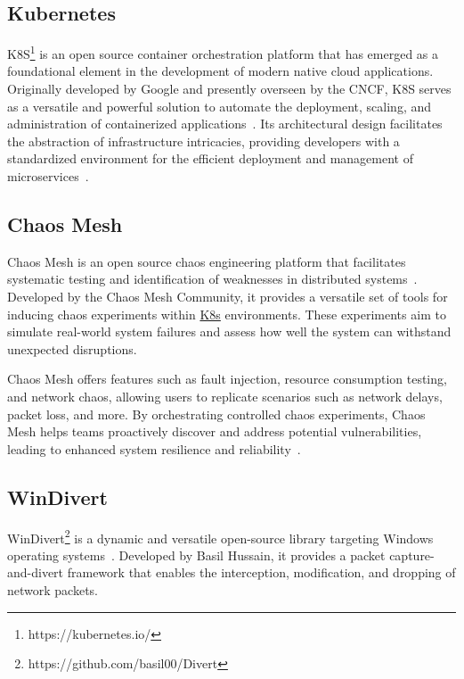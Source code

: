 \subsection{Kubernetes}
\label{subsec:kubernetes}
\acf{K8S}\footnote{https://kubernetes.io/} is an open source container orchestration platform that has emerged as a foundational element in the development of modern native cloud applications. Originally developed by Google and presently overseen by the \ac{CNCF}, \ac{K8S} serves as a versatile and powerful solution to automate the deployment, scaling, and administration of containerized applications~\cite{burns2022kubernetes}. Its architectural design facilitates the abstraction of infrastructure intricacies, providing developers with a standardized environment for the efficient deployment and management of microservices~\cite{noauthor_production-grade_nodate}.


\subsection{Chaos Mesh}
\label{subsec:chaosmesh}
Chaos Mesh is an open source chaos engineering platform that facilitates systematic testing and identification of weaknesses in distributed systems~\cite{noauthor_chaos_nodate}. Developed by the Chaos Mesh Community, it provides a versatile set of tools for inducing chaos experiments within \hyperref[subsec:kubernetes]{K8s} environments. These experiments aim to simulate real-world system failures and assess how well the system can withstand unexpected disruptions.

Chaos Mesh offers features such as fault injection, resource consumption testing, and network chaos, allowing users to replicate scenarios such as network delays, packet loss, and more. By orchestrating controlled chaos experiments, Chaos Mesh helps teams proactively discover and address potential vulnerabilities, leading to enhanced system resilience and reliability~\cite{noauthor_chaos_nodate}.

\subsection{WinDivert}
\label{subsec:windivert}
WinDivert\footnote{https://github.com/basil00/Divert} is a dynamic and versatile open-source library targeting Windows operating systems~\cite{noauthor_windivert:_nodate}. Developed by Basil Hussain, it provides a packet capture-and-divert framework that enables the interception, modification, and dropping of network packets.

